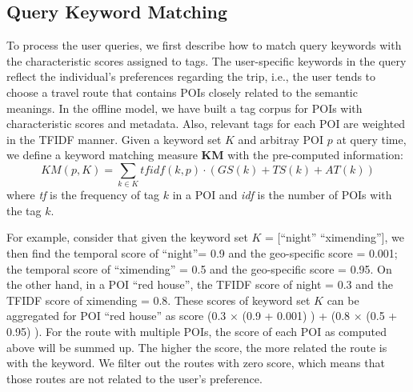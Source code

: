 ﻿\subsection{Query Keyword Matching} \label{subsec:KM}
To process the user queries, we first describe how to match query keywords with the characteristic scores assigned to tags. The user-specific keywords in the query reflect the individual's preferences regarding the trip, i.e., the user tends to choose a travel route that contains POIs closely related to the semantic meanings. In the offline model, we have built a tag corpus for POIs with characteristic scores and metadata. Also, relevant tags for each POI are weighted in the TFIDF manner. Given a keyword set $K$ and arbitray POI $p$ at query time, we define a keyword matching measure \textbf{KM} with the pre-computed information:
\vspace{-1.5mm}
\begin{equation}
KM(p,K) = \sum_{k \in K}{tfidf(k,p) \cdot (GS(k)+TS(k)+AT(k))}
\end{equation}
where \textit{tf} is the frequency of tag $k$ in a POI and \textit{idf} is the number of POIs with the tag $k$.

For example, consider that given the keyword set $K$ = [``night'' ``ximending''], we then find the temporal score of ``night''= 0.9 and the geo-specific score = 0.001; the temporal score of ``ximending'' = 0.5 and the geo-specific score = 0.95. On the other hand, in a POI ``red house'', the TFIDF score of night = 0.3 and the TFIDF score of ximending = 0.8. These scores of keyword set $K$ can be aggregated for POI ``red house'' as score (0.3 $\times$ (0.9 + 0.001) ) + (0.8 $\times$ (0.5 + 0.95) ). For the route with multiple POIs, the score of each POI as computed above will be summed up. The higher the score, the more related the route is with the keyword. We filter out the routes with zero score, which means that those routes are not related to the user's preference.